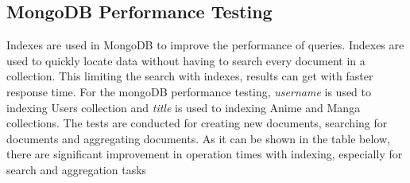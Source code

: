 \subsection*{MongoDB Performance Testing}
Indexes are used in MongoDB to improve the performance of queries. Indexes are used to quickly locate data without having to search every document in a collection.
This limiting the search with indexes, results can get with faster response time.
For the mongoDB performance testing, \textit{username} is used to indexing Users collection and \textit{title} is
used to indexing Anime and Manga collections. The tests are conducted for creating new documents, searching for documents and aggregating documents.
As it can be shown in the table below, there are significant improvement in operation times with indexing, especially for search and aggregation tasks

